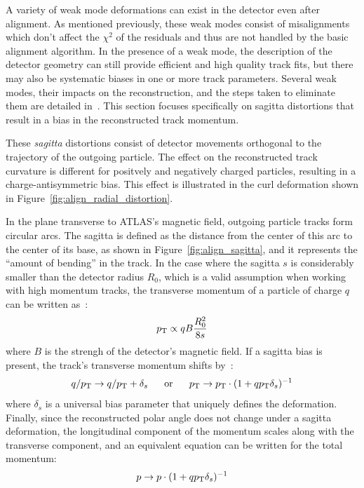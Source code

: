 A variety of weak mode deformations can exist in the detector even after alignment.
As mentioned previously, these weak modes consist of misalignments which don't affect the $\chi^2$ of the residuals and thus are not handled by the basic alignment algorithm.
In the presence of a weak mode, the description of the detector geometry can still provide efficient and high quality track fits, but there may also be systematic biases in one or more track parameters.
Several weak modes, their impacts on the reconstruction, and the steps taken to eliminate them are detailed in~\cite{2014.alignment-performance-8tev, 2012.alignment-systematics}. 
This section focuses specifically on sagitta distortions that result in a bias in the reconstructed track momentum.

These \emph{sagitta} distortions consist of detector movements orthogonal to the trajectory of the outgoing particle.
The effect on the reconstructed track curvature is different for positvely and negatively charged particles, resulting in a charge-antisymmetric bias.
This effect is illustrated in the curl deformation shown in Figure~\ref{fig:align_radial_distortion}.

In the plane transverse to ATLAS's magnetic field, outgoing particle tracks form circular arcs.
The sagitta is defined as the distance from the center of this arc to the center of its base, as shown in Figure~\ref{fig:align_sagitta}, and it represents the ``amount of bending'' in the track.
In the case where the sagitta $s$ is considerably smaller than the detector radius $R_0$, which is a valid assumption when working with high momentum tracks, the transverse momentum of a particle of charge $q$ can be written as~\cite{2018.alignment-radial-distortions}:
\begin{equation}
  \pt \propto q B \frac{R_0^2}{8s}
  \label{eq:align_pt_sagitta}
\end{equation}
where $B$ is the strengh of the detector's magnetic field.
If a sagitta bias is present, the track's transverse momentum shifts by~\cite{2012.alignment-systematics}:
\begin{equation}
  q/\pt\rightarrow q/\pt+\delta_s ~~~~~\textrm{or}~~~~~ \pt\rightarrow \pt\cdot(1+q\pt\delta_s)^{-1}
  \label{eq:align_pt_sagitta_bias}
\end{equation}
where $\delta_s$ is a universal bias parameter that uniquely defines the deformation.
Finally, since the reconstructed polar angle does not change under a sagitta deformation, the longitudinal component of the momentum scales along with the transverse component, and an equivalent equation can be written for the total momentum:
\begin{equation}
  p\rightarrow p\cdot(1+q\pt\delta_s)^{-1}
  \label{eq:align_p_sagitta_bias}
\end{equation}

